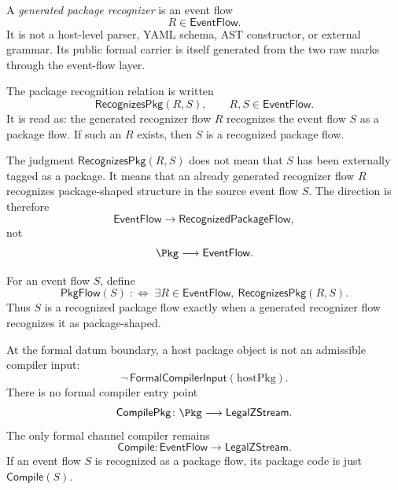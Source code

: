 \begin{definition}
\label{def:package-generated-recognizer}
A \emph{generated package recognizer} is an event flow
$$
  R \in \mathsf{EventFlow}.
$$
It is not a host-level parser, YAML schema, AST constructor, or external grammar. Its public formal carrier is itself generated from the two raw marks through the event-flow layer.
\end{definition}

\begin{definition}
\label{def:package-generated-recognition-relation}
The package recognition relation is written
$$
  \mathsf{RecognizesPkg}(R, S),
  \qquad
  R,S \in \mathsf{EventFlow}.
$$
It is read as: the generated recognizer flow $R$ recognizes the event flow $S$ as a package flow. If such an $R$ exists, then $S$ is a recognized package flow.
\end{definition}

\begin{remark}
\label{rem:package-generated-recognition-not-input}
The judgment $\mathsf{RecognizesPkg}(R,S)$ does not mean that $S$ has been externally tagged as a package. It means that an already generated recognizer flow $R$ recognizes package-shaped structure in the source event flow $S$. The direction is therefore
$$
  \mathsf{EventFlow}
  \longrightarrow
  \mathsf{RecognizedPackageFlow},
$$
not
$$
  \Pkg
  \longrightarrow
  \mathsf{EventFlow}.
$$
\end{remark}

\begin{definition}
\label{def:package-generated-recognized-package-flow}
For an event flow $S$, define
$$
  \mathsf{PkgFlow}(S)
  \;:\Longleftrightarrow\;
  \exists R \in \mathsf{EventFlow},\ \mathsf{RecognizesPkg}(R,S).
$$
Thus $S$ is a recognized package flow exactly when a generated recognizer flow recognizes it as package-shaped.
\end{definition}

\begin{principle}
\label{prin:package-generated-no-external-package-input}
At the formal datum boundary, a host package object is not an admissible compiler input:
$$
  \neg\,\mathsf{FormalCompilerInput}(\mathrm{hostPkg}).
$$
There is no formal compiler entry point
$$
  \mathsf{CompilePkg} \colon \Pkg \longrightarrow \mathsf{LegalZStream}.
$$
The only formal channel compiler remains
$$
  \mathsf{Compile} \colon \mathsf{EventFlow} \longrightarrow \mathsf{LegalZStream}.
$$
If an event flow $S$ is recognized as a package flow, its package code is just $\mathsf{Compile}(S)$.
\end{principle}

